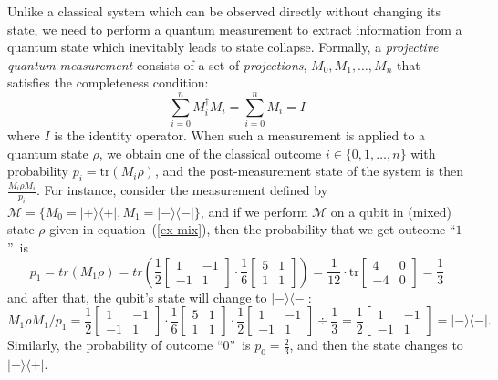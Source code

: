 \documentclass[conference,compsoc, 10pt]{IEEEtran}
\newcommand {\cM } {{\mathcal{M}}}
\newcommand {\tr } {{\mathrm{tr}}}
\def\>{\ensuremath{\rangle}}
\def\<{\ensuremath{\langle}}
\begin{document}
\begin{appendices}
		Unlike a classical system which can be observed directly without changing its
		state, we need to perform a quantum measurement to extract information from a
		quantum state which inevitably leads to state collapse. Formally, a
		\emph{projective quantum measurement} consists of a set of \emph{projections},
		$M_0,M_1,\dots, M_n$ that satisfies the completeness condition:
		$$\sum_{i = 0}^n M_i^\dag M_i = \sum_{i = 0}^n M_i = I$$
		where $I$ is the identity operator. When such a measurement is applied to a quantum state
		$\rho$, we obtain one of the classical outcome $i\in\{0,1,\dots,n\}$ with
		probability $p_i = \mathrm{tr}(M_i\rho)$, and the post-measurement state of
		the system is then $\frac{M_i\rho M_i}{p_i}$.
		For instance, consider the measurement defined by $\cM=\{M_0 = |+\>\<+|,M_1 = |-\>\<-|\}$, and if we perform $\cM$ on a qubit in (mixed) state $\rho$ given in equation~(\ref{ex-mix}), then the probability that we get outcome \textquotedblleft$1$\textquotedblright\ is $$p_1=\mathit{tr}(M_1\rho)=tr\left(\frac{1}{2}\left[\begin{array}{cc}1&-1\\-1&1\end{array}\right]
		\cdot\frac{1}{6}\left[\begin{array}{cc}5& 1\\ 1&1\end{array}\right]
		\right)=\frac{1}{12}\cdot \tr\left[\begin{array}{cc}4&0\\-4&0\end{array}\right]=\frac{1}{3}$$ and after that, the qubit's state will change to $|-\>\<-|$:
		$$M_1\rho M_1/p_1 = \frac{1}{2}\left[\begin{array}{cc}1&-1\\-1&1\end{array}\right]\cdot\frac{1}{6}\left[\begin{array}{cc}5& 1\\ 1&1\end{array}\right]\cdot\frac{1}{2}\left[\begin{array}{cc}1&-1\\-1&1\end{array}\right]\div\frac{1}{3} = \frac{1}{2}\left[\begin{array}{cc}1&-1\\-1&1\end{array}\right] = |-\>\<-|.$$
		Similarly, the probability of outcome \textquotedblleft$0$\textquotedblright\ is $p_0=\frac{2}{3}$, and then the state changes to $|+\>\<+|$. 
		

\end{appendices}
\end{document}

